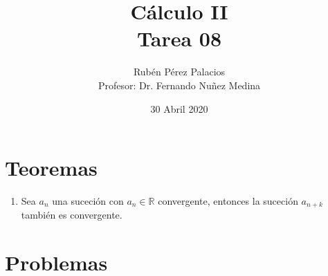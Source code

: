 \documentclass[letterpaper]{article}
\title{Cálculo II\\Tarea 08}
\author{Rubén Pérez Palacios\\Profesor: Dr. Fernando Nuñez Medina}
\date{30 Abril 2020}
\theoremstyle{definition}
\theoremstyle{lemathm}
\theoremstyle{lemademthm}
\newcommand{\R}{\mathbb{R}}
\begin{document}
	\maketitle
	
	\section*{Teoremas}

	\begin{enumerate}
		\item Sea ${a_n}$ una suceción con $a_n \in \R$ convergente, entonces la suceción $a_{n+k}$ también es convergente.
		
		
	\end{enumerate}

    \section*{Problemas}
\end{document}

